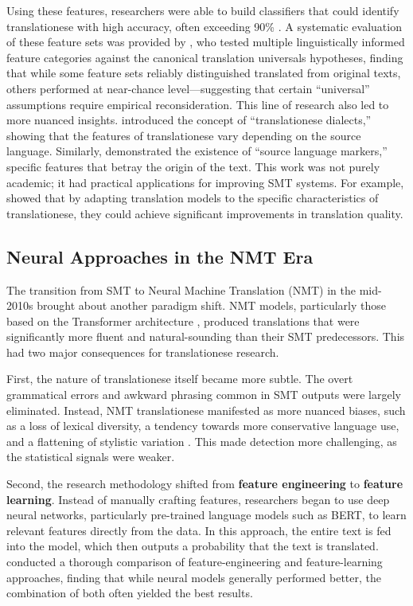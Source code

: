 \documentclass[11pt,a4paper]{article}
\begin{document}
Using these features, researchers were able to build classifiers that could identify translationese with high accuracy, often exceeding 90\% \cite{baroni2006new}. A systematic evaluation of these feature sets was provided by \citet{volansky2015features}, who tested multiple linguistically informed feature categories against the canonical translation universals hypotheses, finding that while some feature sets reliably distinguished translated from original texts, others performed at near-chance level---suggesting that certain ``universal'' assumptions require empirical reconsideration. This line of research also led to more nuanced insights. \citet{koppel2011translationese} introduced the concept of ``translationese dialects,'' showing that the features of translationese vary depending on the source language. Similarly, \citet{van2008source} demonstrated the existence of ``source language markers,'' specific features that betray the origin of the text. This work was not purely academic; it had practical applications for improving SMT systems. For example, \citet{lembersky2013improving} showed that by adapting translation models to the specific characteristics of translationese, they could achieve significant improvements in translation quality.

\subsection{Neural Approaches in the NMT Era}

The transition from SMT to Neural Machine Translation (NMT) in the mid-2010s brought about another paradigm shift. NMT models, particularly those based on the Transformer architecture \cite{vaswani2017attention}, produced translations that were significantly more fluent and natural-sounding than their SMT predecessors. This had two major consequences for translationese research.

First, the nature of translationese itself became more subtle. The overt grammatical errors and awkward phrasing common in SMT outputs were largely eliminated. Instead, NMT translationese manifested as more nuanced biases, such as a loss of lexical diversity, a tendency towards more conservative language use, and a flattening of stylistic variation \cite{vanmassenhove2018getting}. This made detection more challenging, as the statistical signals were weaker.

Second, the research methodology shifted from \textbf{feature engineering} to \textbf{feature learning}. Instead of manually crafting features, researchers began to use deep neural networks, particularly pre-trained language models such as BERT, to learn relevant features directly from the data. In this approach, the entire text is fed into the model, which then outputs a probability that the text is translated. \citet{pylypenko2021comparing} conducted a thorough comparison of feature-engineering and feature-learning approaches, finding that while neural models generally performed better, the combination of both often yielded the best results.
\end{document}
